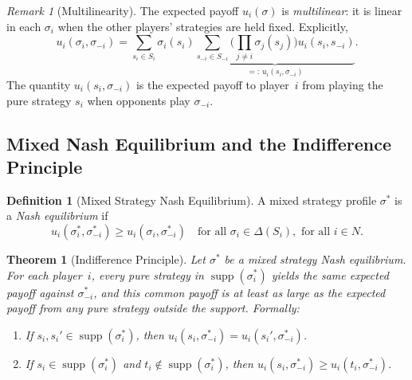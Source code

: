 \documentclass[11pt,a4paper]{article}
\theoremstyle{definition}
\newtheorem{definition}{Definition}[section]
\theoremstyle{plain}
\newtheorem{theorem}{Theorem}[section]
\theoremstyle{remark}
\newtheorem{remark}{Remark}[section]
\DeclareMathOperator{\supp}{supp}
\begin{document}
\begin{remark}[Multilinearity]
\label{rem:multilinear}
The expected payoff $u_i(\sigma)$ is \emph{multilinear}: it is linear in each
$\sigma_i$ when the other players' strategies are held fixed. Explicitly,
\[
    u_i(\sigma_i, \sigma_{-i}) = \sum_{s_i \in S_i} \sigma_i(s_i)
    \underbrace{\sum_{s_{-i} \in S_{-i}}
    \bigg(\prod_{j \neq i} \sigma_j(s_j)\bigg) u_i(s_i, s_{-i})}_{=:\, u_i(s_i, \sigma_{-i})}.
\]
The quantity $u_i(s_i, \sigma_{-i})$ is the expected payoff to player~$i$ from playing
the pure strategy $s_i$ when opponents play $\sigma_{-i}$.
\end{remark}

\subsection{Mixed Nash Equilibrium and the Indifference Principle}
\label{subsec:mixed_ne}

\begin{definition}[Mixed Strategy Nash Equilibrium]
\label{def:mixed_ne}
A mixed strategy profile $\sigma^*$ is a \emph{Nash equilibrium} if
\[
    u_i(\sigma_i^*, \sigma_{-i}^*) \geq u_i(\sigma_i, \sigma_{-i}^*)
    \quad \text{for all } \sigma_i \in \Delta(S_i), \text{ for all } i \in N.
\]
\end{definition}

\begin{theorem}[Indifference Principle]
\label{thm:indifference}
Let $\sigma^*$ be a mixed strategy Nash equilibrium. For each player~$i$, every pure
strategy in $\supp(\sigma_i^*)$ yields the same expected payoff against $\sigma_{-i}^*$,
and this common payoff is at least as large as the expected payoff from any pure
strategy outside the support. Formally:
\begin{enumerate}[nosep,label=(\alph*)]
    \item If $s_i, s_i' \in \supp(\sigma_i^*)$, then
    $u_i(s_i, \sigma_{-i}^*) = u_i(s_i', \sigma_{-i}^*)$.
    \item If $s_i \in \supp(\sigma_i^*)$ and $t_i \notin \supp(\sigma_i^*)$, then
    $u_i(s_i, \sigma_{-i}^*) \geq u_i(t_i, \sigma_{-i}^*)$.
\end{enumerate}
\end{theorem}
\end{document}
